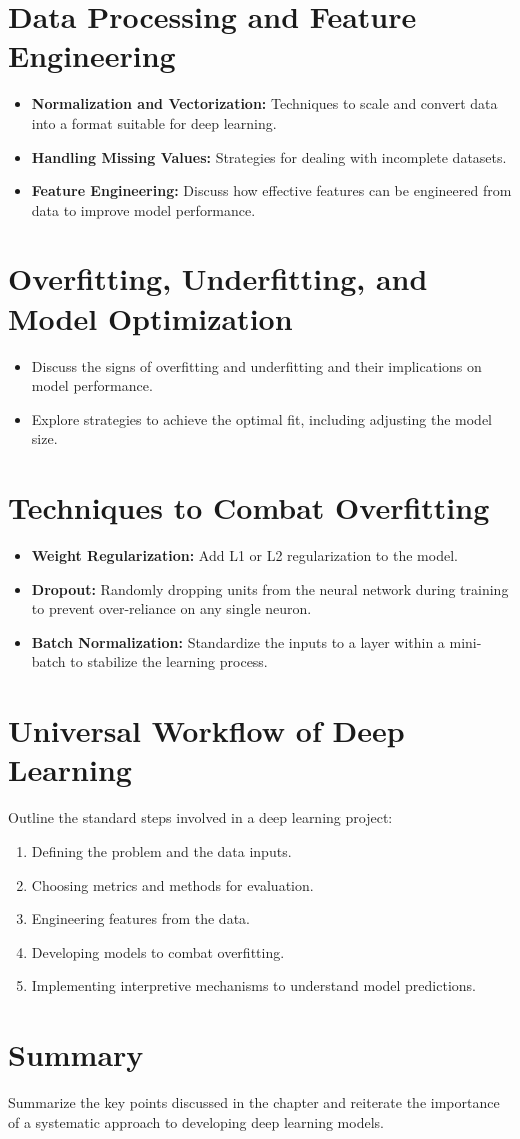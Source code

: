 \section{Data Processing and Feature Engineering}
\begin{itemize}
    \item \textbf{Normalization and Vectorization:} Techniques to scale and convert data into a format suitable for deep learning.
    \item \textbf{Handling Missing Values:} Strategies for dealing with incomplete datasets.
    \item \textbf{Feature Engineering:} Discuss how effective features can be engineered from data to improve model performance.
\end{itemize}

\section{Overfitting, Underfitting, and Model Optimization}
\begin{itemize}
    \item Discuss the signs of overfitting and underfitting and their implications on model performance.
    \item Explore strategies to achieve the optimal fit, including adjusting the model size.
\end{itemize}

\section{Techniques to Combat Overfitting}
\begin{itemize}
    \item \textbf{Weight Regularization:} Add L1 or L2 regularization to the model.
    \item \textbf{Dropout:} Randomly dropping units from the neural network during training to prevent over-reliance on any single neuron.
    \item \textbf{Batch Normalization:} Standardize the inputs to a layer within a mini-batch to stabilize the learning process.
\end{itemize}

\section{Universal Workflow of Deep Learning}
Outline the standard steps involved in a deep learning project:
\begin{enumerate}
    \item Defining the problem and the data inputs.
    \item Choosing metrics and methods for evaluation.
    \item Engineering features from the data.
    \item Developing models to combat overfitting.
    \item Implementing interpretive mechanisms to understand model predictions.
\end{enumerate}

\section{Summary}
Summarize the key points discussed in the chapter and reiterate the importance of a systematic approach to developing deep learning models.

